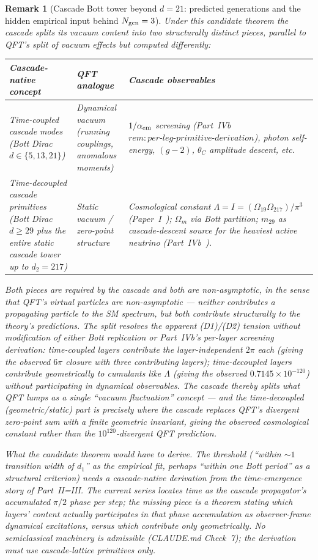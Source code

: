 \documentclass[12pt,a4paper]{article}
\newtheorem{remark}[theorem]{Remark}
\begin{document}
\begin{remark}[Cascade Bott tower beyond $d=21$: predicted generations and the hidden empirical input behind $N_{\rm gen}=3$]
Under this candidate theorem the cascade splits its vacuum content into two structurally distinct pieces, parallel to QFT's split of vacuum effects but computed differently:

\begin{center}
\begin{tabular}{p{4.5cm}p{4cm}p{6.5cm}}
\toprule
Cascade-native concept & QFT analogue & Cascade observables \\
\midrule
\emph{Time-coupled cascade modes} (Bott Dirac $d \in \{5, 13, 21\}$) & Dynamical vacuum (running couplings, anomalous moments) & $1/\alpha_{\rm em}$ screening (Part~IVb~\cite{part4b}~$\mathit{rem{:}per\text{-}leg\text{-}primitive\text{-}derivation}$), photon self-energy, $(g{-}2)$, $\theta_C$ amplitude descent, etc. \\[0.3em]
\emph{Time-decoupled cascade primitives} (Bott Dirac $d \geq 29$ plus the entire static cascade tower up to $d_2 = 217$) & Static vacuum / zero-point structure & Cosmological constant $\Lambda = I = (\Omega_{19}\Omega_{217})/\pi^3$ (Paper~I~\cite{part0}); $\Omega_m$ via Bott partition; $m_{29}$ as cascade-descent source for the heaviest active neutrino (Part~IVb~\cite{part4b}). \\
\bottomrule
\end{tabular}
\end{center}

Both pieces are required by the cascade and both are non-asymptotic, in the sense that QFT's virtual particles are non-asymptotic --- neither contributes a propagating particle to the SM spectrum, but both contribute structurally to the theory's predictions. The split resolves the apparent (D1)/(D2) tension without modification of either Bott replication or Part~IVb's per-layer screening derivation: time-coupled layers contribute the layer-independent $2\pi$ each (giving the observed $6\pi$ closure with three contributing layers); time-decoupled layers contribute geometrically to cumulants like $\Lambda$ (giving the observed $0.7145 \times 10^{-120}$) without participating in dynamical observables. The cascade thereby splits what QFT lumps as a single ``vacuum fluctuation'' concept --- and the time-decoupled (geometric/static) part is precisely where the cascade replaces QFT's divergent zero-point sum with a finite geometric invariant, giving the observed cosmological constant rather than the $10^{120}$-divergent QFT prediction.

\medskip\noindent\emph{What the candidate theorem would have to derive.} The threshold (\,``within $\sim 1$ transition width of $d_1$'' as the empirical fit, perhaps ``within one Bott period'' as a structural criterion) needs a cascade-native derivation from the time-emergence story of Part~II=III. The current series locates time as the cascade propagator's accumulated $\pi/2$ phase per step; the missing piece is a theorem stating which layers' content actually participates in that phase accumulation as observer-frame dynamical excitations, versus which contribute only geometrically. No semiclassical machinery is admissible (CLAUDE.md Check~7); the derivation must use cascade-lattice primitives only.


\end{remark}
\end{document}
